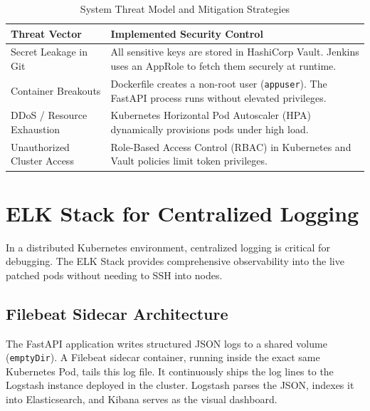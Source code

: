 \documentclass[12pt,a4paper]{article}
\begin{document}
\begin{table}[H]
\centering
\begin{tabular}{|p{}|p{}|}
\hline
\textbf{Threat Vector} & \textbf{Implemented Security Control} \\ \hline
Secret Leakage in Git & All sensitive keys are stored in HashiCorp Vault. Jenkins uses an AppRole to fetch them securely at runtime. \\ \hline
Container Breakouts & Dockerfile creates a non-root user (\texttt{appuser}). The FastAPI process runs without elevated privileges. \\ \hline
DDoS / Resource Exhaustion & Kubernetes Horizontal Pod Autoscaler (HPA) dynamically provisions pods under high load. \\ \hline
Unauthorized Cluster Access & Role-Based Access Control (RBAC) in Kubernetes and Vault policies limit token privileges. \\ \hline
\end{tabular}
\caption{System Threat Model and Mitigation Strategies}
\end{table}

\section{ELK Stack for Centralized Logging}
In a distributed Kubernetes environment, centralized logging is critical for debugging. The ELK Stack provides comprehensive observability into the live patched pods without needing to SSH into nodes.

\subsection{Filebeat Sidecar Architecture}
The FastAPI application writes structured JSON logs to a shared volume (\texttt{emptyDir}). A Filebeat sidecar container, running inside the exact same Kubernetes Pod, tails this log file. It continuously ships the log lines to the Logstash instance deployed in the cluster. Logstash parses the JSON, indexes it into Elasticsearch, and Kibana serves as the visual dashboard.
\end{document}
